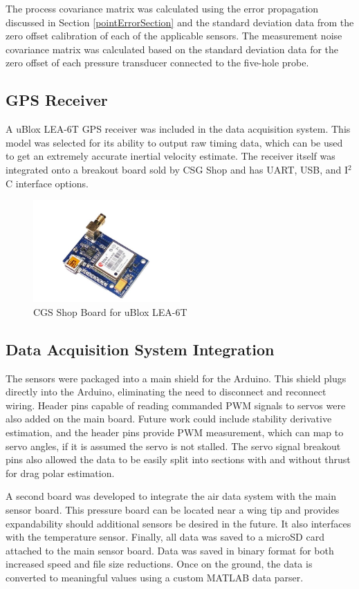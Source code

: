 The process covariance matrix was calculated using the error propagation discussed in Section \ref{pointErrorSection} and the standard deviation data from the zero offset calibration of each of the applicable sensors. The measurement noise covariance matrix was calculated based on the standard deviation data for the zero offset of each pressure transducer connected to the five-hole probe.

\subsection*{GPS Receiver}
A uBlox LEA-6T GPS receiver was included in the data acquisition system. This model was selected for its ability to output raw timing data, which can be used to get an extremely accurate inertial velocity estimate\cite{ubloxDemo}. The receiver itself was integrated onto a breakout board sold by CSG Shop and has UART, USB, and I$^2$C interface options. 

\begin{figure}[H]

  \centering
    \includegraphics[width=0.5\textwidth]{figures/gpsNoBack.jpg}
  \caption{CGS Shop Board for uBlox LEA-6T} \label{gpsPicture}
\end{figure}

\subsection*{Data Acquisition System Integration}
The sensors were packaged into a main shield for the Arduino. This shield plugs directly into the Arduino, eliminating the need to disconnect and reconnect wiring. Header pins capable of reading commanded PWM signals to servos were also added on the main board. Future work could include stability derivative estimation, and the header pins provide PWM measurement, which can map to servo angles, if it is assumed the servo is not stalled. The servo signal breakout pins also allowed the data to be easily split into sections with and without thrust for drag polar estimation.

A second board was developed to integrate the air data system with the main sensor board. This pressure board can be located near a wing tip and provides expandability should additional sensors be desired in the future. It also interfaces with the temperature sensor. Finally, all data was saved to a microSD card attached to the main sensor board. Data was saved in binary format for both increased speed and file size reductions. Once on the ground, the data is converted to meaningful values using a custom MATLAB data parser.
